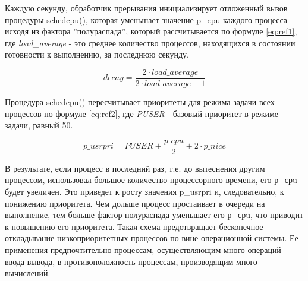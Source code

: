 \begin{figure}[ht!]
\end{figure}

Каждую секунду, обработчик прерывания 
инициализирует отложенный вызов процедуры
schedcpu(), которая уменьшает значение p\_cpu каждого 
процесса исходя из фактора ''полураспада'', который рассчитывается по формуле \ref{eq:ref1}, где
\textit{load\_average} - это среднее количество процессов, находящихся в состоянии готовности к выполнению, за последнюю секунду.

\begin{equation}
    \label{eq:ref1}
    decay = \frac{2 \cdot load\_average}{2 \cdot load\_average + 1}
\end{equation}

Процедура schedcpu() пересчитывает приоритеты для режима задачи
всех процессов по формуле \ref{eq:ref2}, где \textit{PUSER} - базовый приоритет в режиме задачи, равный 50.

\begin{equation}
    \label{eq:ref2}
    p\_usrpri = PUSER + \frac{p\_cpu}{2} + 2 \cdot p\_nice
\end{equation}

В результате, если процесс в последний раз, т.е. до вытеснения другим
процессом, использовал большое количество процессорного времени, его
р\_срu будет увеличен. Это приведет к росту значения p\_usrpri и,
следовательно, к понижению приоритета. 
Чем дольше процесс простаивает в очереди на выполнение,
тем больше фактор полураспада уменьшает его
р\_срu, что приводит к повышению его приоритета. Такая схема
предотвращает бесконечное откладывание низкоприоритетных процессов
по вине операционной системы.
Ее применения предпочтительно процессам, осуществляющим много
операций ввода-вывода, в противоположность процессам, производящим
много вычислений.

